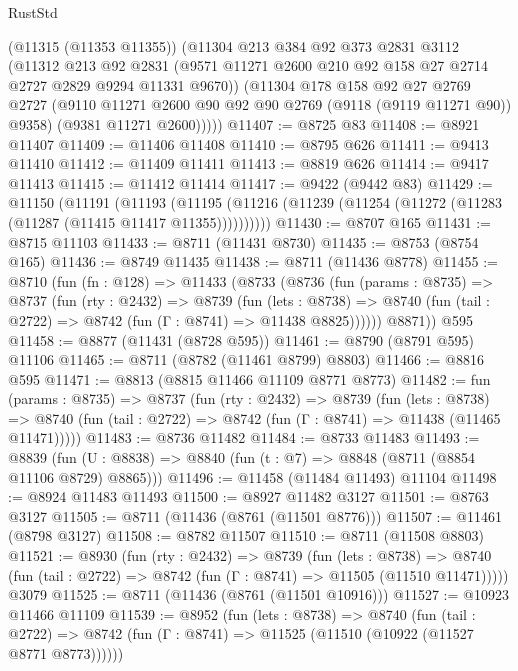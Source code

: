 \begin{lexlean}{RustStd}
\begin{coremodule}
        (@11315 (@11353 @11355))
        (@11304
          @213
          @384
          @92
          @373
          @2831
          @3112
          (@11312
            @213
            @92
            @2831
            (@9571 @11271 @2600 @210 @92 @158 @27 @2714 @2727 @2829 @9294 @11331 @9670))
          (@11304
            @178
            @158
            @92
            @27
            @2769
            @2727
            (@9110 @11271 @2600 @90 @92 @90 @2769 (@9118 (@9119 @11271 @90)) @9358)
            (@9381 @11271 @2600)))))
@11407 := @8725 @83
@11408 := @8921 @11407
@11409 := @11406 @11408
@11410 := @8795 @626
@11411 := @9413 @11410
@11412 := @11409 @11411
@11413 := @8819 @626
@11414 := @9417 @11413
@11415 := @11412 @11414
@11417 := @9422 (@9442 @83)
@11429 := @11150
    (@11191
      (@11193
        (@11195 (@11216 (@11239 (@11254 (@11272 (@11283 (@11287 (@11415 @11417 @11355))))))))))
@11430 := @8707 @165
@11431 := @8715 @11103
@11433 := @8711 (@11431 @8730)
@11435 := @8753 (@8754 @165)
@11436 := @8749 @11435
@11438 := @8711 (@11436 @8778)
@11455 := @8710
    (fun (fn : @128) =>
    @11433
      (@8733
        (@8736
          (fun (params : @8735) =>
          @8737
            (fun (rty : @2432) =>
            @8739
              (fun (lets : @8738) =>
              @8740 (fun (tail : @2722) => @8742 (fun (Γ : @8741) => @11438 @8825))))))
        @8871))
    @595
@11458 := @8877 (@11431 (@8728 @595))
@11461 := @8790 (@8791 @595) @11106
@11465 := @8711 (@8782 (@11461 @8799) @8803)
@11466 := @8816 @595
@11471 := @8813 (@8815 @11466 @11109 @8771 @8773)
@11482 := fun (params : @8735) =>
  @8737
    (fun (rty : @2432) =>
    @8739
      (fun (lets : @8738) =>
      @8740 (fun (tail : @2722) => @8742 (fun (Γ : @8741) => @11438 (@11465 @11471)))))
@11483 := @8736 @11482
@11484 := @8733 @11483
@11493 := @8839
    (fun (U : @8838) => @8840 (fun (t : @7) => @8848 (@8711 (@8854 @11106 @8729) @8865)))
@11496 := @11458 (@11484 @11493) @11104
@11498 := @8924 @11483 @11493
@11500 := @8927 @11482 @3127
@11501 := @8763 @3127
@11505 := @8711 (@11436 (@8761 (@11501 @8776)))
@11507 := @11461 (@8798 @3127)
@11508 := @8782 @11507
@11510 := @8711 (@11508 @8803)
@11521 := @8930
    (fun (rty : @2432) =>
    @8739
      (fun (lets : @8738) =>
      @8740 (fun (tail : @2722) => @8742 (fun (Γ : @8741) => @11505 (@11510 @11471)))))
    @3079
@11525 := @8711 (@11436 (@8761 (@11501 @10916)))
@11527 := @10923 @11466 @11109
@11539 := @8952
    (fun (lets : @8738) =>
    @8740
      (fun (tail : @2722) =>
      @8742 (fun (Γ : @8741) => @11525 (@11510 (@10922 (@11527 @8771 @8773))))))

\end{coremodule}
\end{lexlean}
